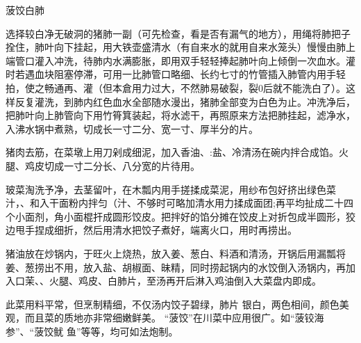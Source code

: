 \begin{recipe}[菠饺银肺]{菠饺白肺}

\ingredients


\cooking

\step 选择较白净无破洞的猪肺一副（可先检查，看是否有漏气的地方），用绳将肺把子拴住，肺叶向下挂起，用大铁壶盛清水（有自来水的就用自来水笼头）慢慢由肺上端管口灌入冲洗，待肺内水满膨胀，即用双手轻轻捧起肺叶向上倾倒一次血水。灌时若遇血块阻塞停滞，可用一比肺管口略细、长约七寸的竹管插入肺管内用手轻拍，使之畅通再、灌（但本倉用力过大，不然肺易破裂，裂0后就不能洗白了）。这样反复灌洗，到肺内红色血水全部随水漫出，猪肺全部变为白色为止。冲洗净后，把肺叶向上肺管向下用竹筲箕装起，将水滤干，再照原来方法把肺挂起，滤净水，入沸水锅中煮熟，切成长一寸二分、宽一寸、厚半分的片。

\step 猪肉去筋，在菜墩上用刀剁成细泥，加入香油、:盐、冷清汤在碗内拌合成馅。火腿、鸡皮切成一寸二分长、八分宽的片待用。

\step 玻菜淘洗予净，去茎留叶，在木瓢内用手搓揉成菜泥，用纱布包好挤出绿色菜汁，、和入干面粉内拌匀（汁、不够时可略加清水用力揉成面团;再平均扯成二十四个小面剂，角小面棍扞成圆形饺皮。把拌好的馅分摊在饺皮上对折包成半圆形，狡边甩手捏成细折，然后用清水把饺子煮好，端离火口，用时再捞出。

\step 猪油放在炒锅内，于旺火上烧热，放入姜、葱白、料酒和清汤，开锅后用漏瓢将姜、葱捞出不用，放入盐、胡椒面、昧精，同时捞起锅内的水饺倒入汤锅内，再加入口茉、、火腿、鸡皮、白肺片，至汤再开后淋入鸡油倒入大菜盘内即成。

\notes

此菜用料平常，但烹制精细，不仅汤内饺子碧绿，肺片
银白，两色相间，颜色美观，而且菜的质地亦非常细嫩鲜美。 “菠饺”在川菜中应用很广。如“菠铰海参”、“菠饺鱿 鱼”等等，均可如法炮制。

\end{recipe}

